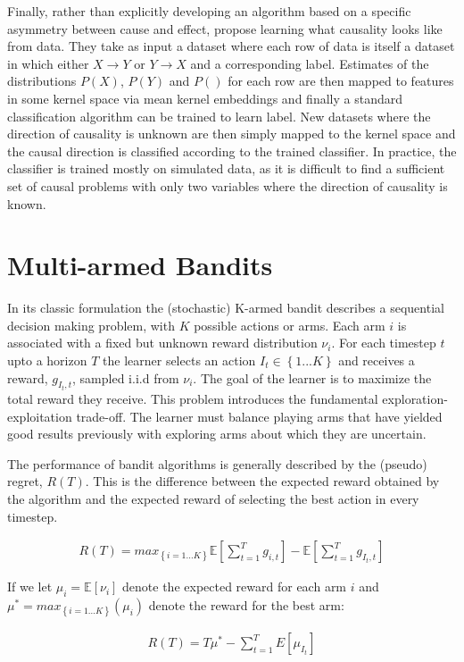 \documentclass[11pt,a4paper]{article}
\newcommand{\E}[1]{\mathbb E\left[{#1}\right]}
\newcommand{\set}[1]{\left\{#1\right\}}
\newcommand{\eqn}[1]{\begin{align}#1\end{align}}
\begin{document}
Finally, rather than explicitly developing an algorithm based on a specific asymmetry between cause and effect, \cite{LopezPaz2014} propose learning what causality looks like from data. They take as input a dataset where each row of data is itself a dataset in which either $X \rightarrow Y$ or $Y \rightarrow X$ and a corresponding label. Estimates of the distributions $P(X)$, $P(Y)$ and $P()$ for each row are then mapped to features in some kernel space via mean kernel embeddings and finally a standard classification algorithm can be trained to learn label. New datasets where the direction of causality is unknown are then simply mapped to the kernel space and the causal direction is classified according to the trained classifier. In practice, the classifier is trained mostly on simulated data, as it is difficult to find a sufficient set of causal problems with only two variables where the direction of causality is known. 

 
\section{Multi-armed Bandits}

In its classic formulation \cite{Robbins1952} the (stochastic) K-armed bandit describes a sequential decision making problem, with $K$ possible actions or arms. Each arm $i$ is associated with a fixed but unknown reward distribution $\nu_i$. For each timestep $t$ upto a horizon $T$ the learner selects an action $I_t \in \set{1...K}$ and receives a reward, $g_{I_t,t}$, sampled i.i.d from $\nu_i$. The goal of the learner is to maximize the total reward they receive. This problem introduces the fundamental exploration-exploitation trade-off. The learner must balance playing arms that have yielded good results previously with exploring arms about which they are uncertain. 

The performance of bandit algorithms is generally described by the (pseudo) regret, $R(T)$. This is the difference between the expected reward obtained by the algorithm and the expected reward of selecting the best action in every timestep. 

\eqn {
R(T) = max_{\set{i=1...K}} \E{\sum_{t=1}^T g_{i,t}} - \E{\sum_{t=1}^T g_{I_t,t}}
}

If we let $\mu_i = \E{\nu_i}$ denote the expected reward for each arm $i$ and $\mu^* = max_{\set{i=1...K}}(\mu_i)$ denote the reward for the best arm:

\eqn {
R(T) = T\mu^* - \sum_{t=1}^T E[\mu_{I_t}] 
} 
\end{document}
